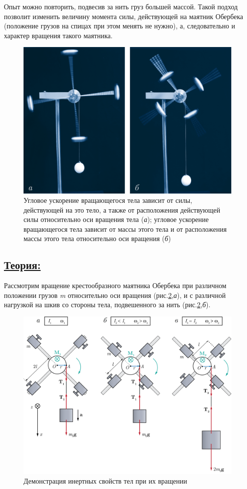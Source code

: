 \documentclass[14pt,a4paper,oneside]{extarticle}	%
\begin{document}
Опыт можно повторить, подвесив за нить груз большей массой.
Такой подход позволит изменить величину момента силы, действующей на маятник Обербека (положение грузов на спицах при этом менять не нужно), а, следовательно и характер вращения такого маятника.
	
	\begin{figure}[H] 	
		\centering 	
		\includegraphics[width=0.8\linewidth]{oberbeck-3.png}
		\caption{Угловое ускорение вращающегося тела зависит от силы, действующей на это тело, а также от расположения действующей силы относительно оси вращения тела (\textit{а}); угловое ускорение 
			вращающегося тела зависит от массы этого тела и от расположения массы этого тела относительно оси вращения (\textit{б})}
		\label{oberbeck-3}
	\end{figure}
	
	\newpage
	\subsection*{\underline{Теория:}}
	
	Рассмотрим вращение крестообразного маятника Обербека при различном положении грузов \textit{m} относительно оси вращения (рис.\ref{oberbeck-4},\textit{а}), и с различной нагрузкой на шкив со стороны тела, подвешенного за нить (рис.\ref{oberbeck-4},\textit{б}). 
	
	\begin{figure}[H] 	
		\centering 	
		\includegraphics[width=0.9\linewidth]{oberbeck-4.png}
		\caption{Демонстрация инертных свойств тел при их вращении}
		\label{oberbeck-4}
	\end{figure}	
	
\end{document}
